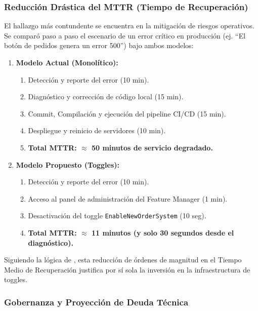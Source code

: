 \subsubsection{Reducción Drástica del MTTR (Tiempo de Recuperación)}

El hallazgo más contundente se encuentra en la mitigación de riesgos operativos. Se comparó paso a paso el escenario de un error crítico en producción (ej. ``El botón de pedidos genera un error 500'') bajo ambos modelos:

\begin{enumerate}
    \item \textbf{Modelo Actual (Monolítico):}
    \begin{enumerate}
        \item Detección y reporte del error (10 min).
        \item Diagnóstico y corrección de código local (15 min).
        \item Commit, Compilación y ejecución del pipeline CI/CD (15 min).
        \item Despliegue y reinicio de servidores (10 min).
        \item \textbf{Total MTTR: $\approx$ 50 minutos de servicio degradado.}
    \end{enumerate}

    \item \textbf{Modelo Propuesto (Toggles):}
    \begin{enumerate}
        \item Detección y reporte del error (10 min).
        \item Acceso al panel de administración del Feature Manager (1 min).
        \item Desactivación del toggle \texttt{EnableNewOrderSystem} (10 seg).
        \item \textbf{Total MTTR: $\approx$ 11 minutos (y solo 30 segundos desde el diagnóstico).}
    \end{enumerate}
\end{enumerate}

Siguiendo la lógica de \cite{ramaswamy2024zerodowntime}, esta reducción de órdenes de magnitud en el Tiempo Medio de Recuperación justifica por sí sola la inversión en la infraestructura de toggles.



\subsubsection{Gobernanza y Proyección de Deuda Técnica}

